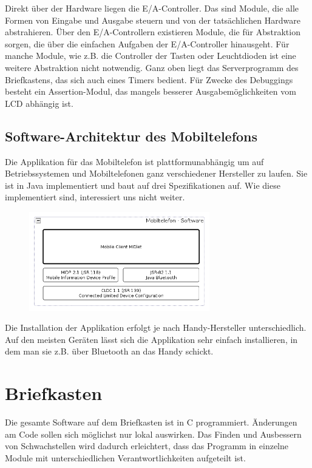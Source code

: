 \documentclass[ngerman]{article}
\begin{document}
Direkt über der Hardware liegen die E/A-Controller. Das sind Module, die alle
Formen von Eingabe und Ausgabe steuern und von der tatsächlichen Hardware
abstrahieren. Über den E/A-Controllern existieren Module, die für Abstraktion
sorgen, die über die einfachen Aufgaben der E/A-Controller hinausgeht. Für
manche Module, wie z.B. die Controller der Tasten oder Leuchtdioden ist eine
weitere Abstraktion nicht notwendig. Ganz oben liegt das Serverprogramm des
Briefkastens, das sich auch eines Timers bedient. Für Zwecke des Debuggings
besteht ein Assertion-Modul, das mangels besserer Ausgabemöglichkeiten vom LCD
abhängig ist.


\subsection{Software-Architektur des Mobiltelefons}

Die Applikation für das Mobiltelefon ist plattformunabhängig um auf
Betriebssystemen und Mobiltelefonen ganz verschiedener Hersteller zu laufen. Sie
ist in Java implementiert und baut auf drei Spezifikationen auf. Wie diese
implementiert sind, interessiert uns nicht weiter.

\begin{figure}[h!] \begin{center}
    \includegraphics[width=0.7\textwidth]{media/mobile-client-arch}
\end{center} \end{figure}

Die Installation der Applikation erfolgt je nach Handy-Hersteller
unterschiedlich. Auf den meisten Geräten lässt sich die Applikation sehr
einfach installieren, in dem man sie z.B. über Bluetooth an das Handy schickt.


\section{Briefkasten}

Die gesamte Software auf dem Briefkasten ist in C programmiert. Änderungen am
Code sollen sich möglichst nur lokal auswirken. Das Finden und Ausbessern von
Schwachstellen wird dadurch erleichtert, dass das Programm in einzelne Module
mit unterschiedlichen Verantwortlichkeiten aufgeteilt ist.
\end{document}
